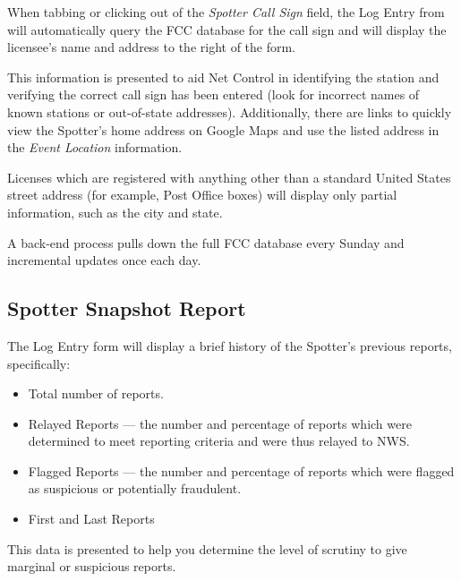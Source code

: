 \documentclass[pdflatex,letterpaper,twoside,12pt]{book}
\begin{document}
When tabbing or clicking out of the \emph{Spotter Call Sign} field, the Log Entry from will automatically query the FCC database for the call sign and will display the licensee's name and address to the right of the form.

This information is presented to aid Net Control in identifying the station and verifying the correct call sign has been entered (look for incorrect names of known stations or out-of-state addresses).  Additionally, there are links to quickly view the Spotter's home address on Google Maps and use the listed address in the \emph{Event Location} information.


Licenses which are registered with anything other than a standard United States street address (for example, Post Office boxes) will display only partial information, such as the city and state.

A back-end process pulls down the full FCC database every Sunday and incremental updates once each day.

\subsection{Spotter Snapshot Report}

The Log Entry form will display a brief history of the Spotter's previous reports, specifically:

\begin{itemize}
\item Total number of reports.
\item Relayed Reports --- the number and percentage of reports which were determined to meet reporting criteria and were thus relayed to NWS.
\item Flagged Reports --- the number and percentage of reports which were flagged as suspicious or potentially fraudulent.
\item First and Last Reports
\end{itemize}

This data is presented to help you determine the level of scrutiny to give marginal or suspicious reports.

\end{document}

